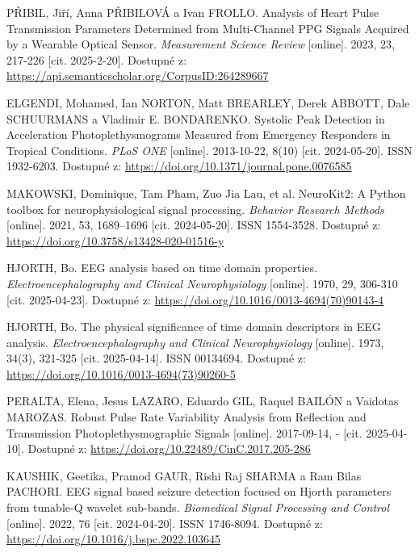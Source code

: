 \begin{thebibliography}{99}
		PŘIBIL, Jiří, Anna PŘIBILOVÁ a Ivan FROLLO.
		Analysis of Heart Pulse Transmission Parameters Determined from Multi-Channel PPG Signals Acquired by a Wearable Optical Sensor.
		\emph{Measurement Science Review} [online].
		2023, 23, 217-226 [cit. 2025-2-20].
		Dostupné z: \url{https://api.semanticscholar.org/CorpusID:264289667}

		ELGENDI, Mohamed, Ian NORTON, Matt BREARLEY, Derek ABBOTT, Dale SCHUURMANS a Vladimir E. BONDARENKO.
		Systolic Peak Detection in Acceleration Photoplethysmograms Measured from Emergency Responders in Tropical Conditions.
		\emph{PLoS ONE} [online].
		2013-10-22, 8(10) [cit. 2024-05-20].
		ISSN 1932-6203.
		Dostupné z: \url{https://doi.org/10.1371/journal.pone.0076585}

		MAKOWSKI, Dominique, Tam Pham, Zuo Jia Lau, et al.
		NeuroKit2: A Python toolbox for neurophysiological signal processing.
		\emph{Behavior Research Methods} [online].
		2021, 53, 1689–1696 [cit. 2024-05-20].
		ISSN 1554-3528.
		Dostupné z: \url{https://doi.org/10.3758/s13428-020-01516-y}

		HJORTH, Bo.
		EEG analysis based on time domain properties.
		\emph{Electroencephalography and Clinical Neurophysiology} [online].
		1970, 29, 306-310 [cit. 2025-04-23].
		Dostupné z: \url{https://doi.org/10.1016/0013-4694(70)90143-4}

		HJORTH, Bo.
		The physical significance of time domain descriptors in EEG analysis.
		\emph{Electroencephalography and Clinical Neurophysiology} [online].
		1973, 34(3), 321-325 [cit. 2025-04-14].
		ISSN 00134694.
		Dostupné z: \url{https://doi.org/10.1016/0013-4694(73)90260-5}

		PERALTA, Elena, Jesus LAZARO, Eduardo GIL, Raquel BAILÓN a Vaidotas MAROZAS.
		Robust Pulse Rate Variability Analysis from Reflection and Transmission Photoplethysmographic Signals [online].
		2017-09-14, - [cit. 2025-04-10].
		Dostupné z: \url{https://doi.org/10.22489/CinC.2017.205-286}

		KAUSHIK, Geetika, Pramod GAUR, Rishi Raj SHARMA a Ram Bilas PACHORI.
		EEG signal based seizure detection focused on Hjorth parameters from tunable-Q wavelet sub-bands.
		\emph{Biomedical Signal Processing and Control} [online].
		2022, 76 [cit. 2024-04-20].
		ISSN 1746-8094.
		Dostupné z: \url{https://doi.org/10.1016/j.bspc.2022.103645}


\end{thebibliography}
